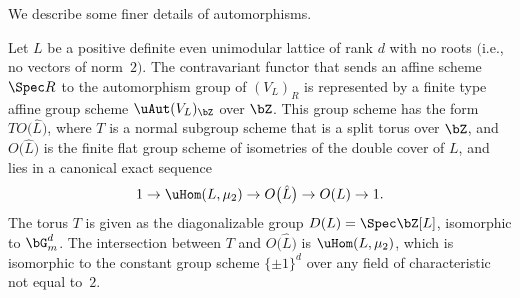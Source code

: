 We describe some finer details of automorphisms.

\begin{prop} \label{prop:automorphism-group-of-standard-R-form}Let $L$ be a positive definite even unimodular lattice of rank $d$ with no roots $($i.e., no vectors of norm~$2)$. The contravariant functor that sends an affine scheme $\Spec R$ to the automorphism group of $(V_L)_R$ is represented by a finite type affine group scheme $\uAut (V_L)_\bZ$ over $\bZ$. This group scheme has the form $T O\big(\hat{L}\big)$, where $T$ is a normal subgroup scheme that is a split torus over $\bZ$, and $O\big(\hat{L}\big)$ is the finite flat group scheme of isometries of the double cover of $L$, and lies in a canonical exact sequence
\begin{gather*} 1 \to \uHom(L,\mu_2) \to O\big(\hat{L}\big) \to O(L) \to 1. \end{gather*}
The torus $T$ is given as the diagonalizable group $D(L) = \Spec \bZ[L]$, isomorphic to $\bG_m^d$. The intersection between $T$ and $O\big(\hat{L}\big)$ is $\uHom(L,\mu_2)$, which is isomorphic to the constant group scheme $\{\pm 1\}^d$ over any field of characteristic not equal to~$2$.
\end{prop}
